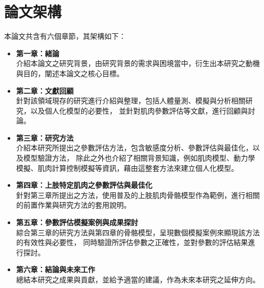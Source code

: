 
\clearpage

\section{論文架構}
本論文共含有六個章節，其架構如下：

\begin{itemize}
    \item \textbf{第一章：緒論}
    \\ 介紹本論文之研究背景，由研究背景的需求與困境當中，衍生出本研究之動機與目的，闡述本論文之核心目標。
    \item \textbf{第二章：文獻回顧}
    \\ 針對該領域現存的研究進行介紹與整理，包括人體量測、模擬與分析相關研究，以及個人化模型的必要性，
    並針對肌肉參數評估等文獻，進行回顧與討論。
    \item \textbf{第三章：研究方法}
    \\ 介紹本研究所提出之參數評估方法，包含敏感度分析、參數評估與最佳化，以及模型驗證方法，
    除此之外也介紹了相關背景知識，例如肌肉模型、動力學模擬、肌肉計算控制模擬等資訊，藉由這整套方法來建立個人化模型。
    \item \textbf{第四章：上肢特定肌肉之參數評估與最佳化}
    \\ 針對第三章所提出之方法，使用普及的上肢肌肉骨骼模型作為範例，進行相關的前置作業與研究方法的套用說明。
    \item \textbf{第五章：參數評估模擬案例與成果探討}
    \\ 綜合第三章的研究方法與第四章的骨骼模型，呈現數個模擬案例來顯現該方法的有效性與必要性，
    同時驗證所評估參數之正確性，並對參數的評估結果進行探討。
    \item \textbf{第六章：結論與未來工作}
    \\ 總結本研究之成果與貢獻，並給予適當的建議，作為未來本研究之延伸方向。
\end{itemize}

\clearpage
